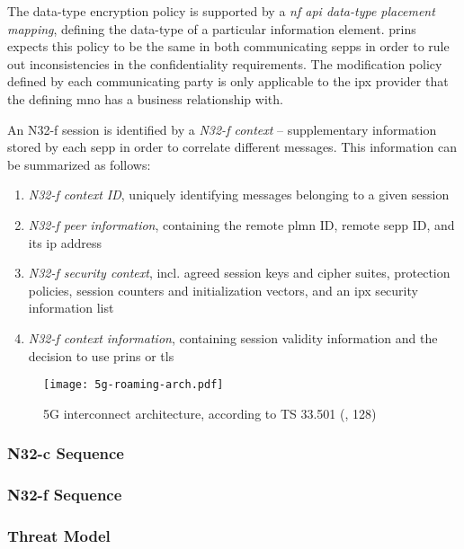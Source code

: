 The data-type encryption policy is supported by a \textit{\gls{nf} \gls{api} data-type placement mapping}, defining the data-type of a particular information element.
\gls{prins} expects this policy to be the same in both communicating \glspl{sepp} in order to rule out inconsistencies in the confidentiality requirements.
The modification policy defined by each communicating party is only applicable to the \gls{ipx} provider that the defining \gls{mno} has a business relationship with.

An N32-f session is identified by a \textit{N32-f context} -- supplementary information stored by each \gls{sepp} in order to correlate different messages.
This information can be summarized as follows:

\begin{enumerate}[label=--]
    \item \textit{N32-f context ID}, uniquely identifying messages belonging to a given session
    \item \textit{N32-f peer information}, containing the remote \gls{plmn} ID, remote \gls{sepp} ID, and its \gls{ip} address
    \item \textit{N32-f security context}, incl. agreed session keys and cipher suites, protection policies, session counters and initialization vectors, and an \gls{ipx} security information list
    \item \textit{N32-f context information}, containing session validity information and the decision to use \gls{prins} or \gls{tls}
\end{enumerate}


\begin{figure}[t]
    \texttt{[image: 5g-roaming-arch.pdf]}
    \centering
    \caption{5G interconnect architecture, according to TS 33.501 (\cite{3gpp.33.501}, 128)}
    \label{fig:n32}
\end{figure}


\subsubsection{N32-c Sequence}

\subsubsection{N32-f Sequence}

\subsubsection{Threat Model}
